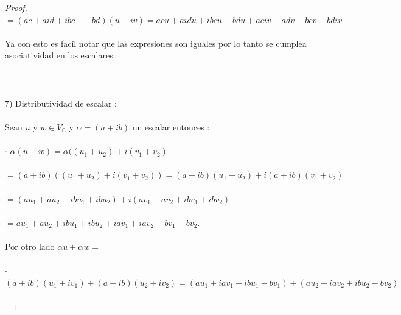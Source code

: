 \documentclass[11pt]{article}
\theoremstyle{definition} %
\begin{document}
\begin{proof}
\\

$= (ac +aid + ibc + -bd)(u +iv) = acu + aidu +ibcu -bdu + aciv -adv - bcv - bdiv$\\

\\

Ya con esto es facíl notar que las expresiones son iguales por lo tanto se cumplea asociatividad en los escalares.\\

\\

\\

\\

7) Distributividad de escalar :\\

\\

Sean $u$ y $w \in V_\mathbb{C}$ y $\alpha = (a + ib)$ un escalar entonces :\\

\\

$\cdot$ $\alpha(u + w) = \alpha((u_1 + u_2) + i(v_1 + v_2)$\\

\\

$= (a + ib)((u_1+u_2) + i(v_1+ v_2)) = (a +ib)(u_1 + u_2) + i(a + ib)(v_1 + v_2)$\\

\\

$= (au_1 + au_2 + ibu_1 + ibu_2) + i(av_1 + av_2 + ibv_1 + ibv_2)$\\

\\

$= au_1 + au_2 + ibu_1 + ibu_2 + iav_1 + iav_2 - bv_1 -bv_2$.\\

\\

Por otro lado $\alpha u + \alpha w = $\\

\\

$\cdot$ $(a +ib)(u_1 + iv_1) + (a + ib)(u_2 + iv_2) = (au_1 + iav_1 + ibu_1 -bv_1) + (au_2 + iav_2 + ibu_2 - bv_2)$\\

\\


\end{proof}
\end{document}
